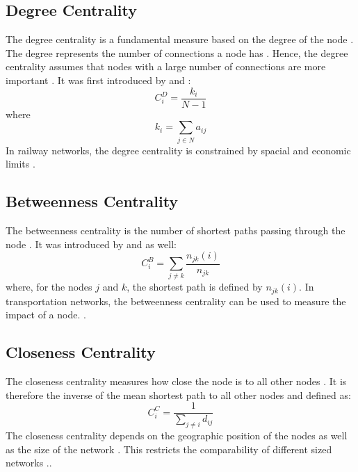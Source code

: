 \documentclass{Resources/netsci-project}
\begin{document}
\subsection{Degree Centrality}
The degree centrality is a fundamental measure based on the degree of the node \autocite{ComplexTopology}. The degree represents the number of connections a node has \autocite{ComplexTopology}. Hence, the degree centrality assumes that nodes with a large number of connections are more important \autocite{ComplexTopology}. It was first introduced by \textcite{Freeman} and \textcite{Freeman2}:
\begin{equation} \label{eqRestMass}
C_{i}^{D} = \dfrac{k_i}{N-1}
\end{equation}
where 
\begin{equation} \label{eqRestMass}
k_{i} = \sum_{j \in N}a_{ij}
\end{equation}
In railway networks, the degree centrality is constrained by spacial and economic limits \autocite{GraphSwiss}.

\subsection{Betweenness Centrality}
The betweenness centrality is the number of shortest paths passing through the node \autocite{ComplexTopology}. It was introduced  by \textcite{Freeman} and \textcite{Freeman2} as well:
\begin{equation} \label{eqRestMass}
C_{i}^{B} = \sum_{j \neq k} \dfrac{n_{jk}(i)}{n_{jk}}
\end{equation}
where, for the nodes $ j $ and $ k $, the shortest path is defined by $n_{jk}(i) $. In transportation networks, the betweenness centrality can be used to measure the impact of a node. \autocite{ComplexTopology}.

\subsection{Closeness Centrality}
The closeness centrality measures how close the node is to all other nodes \autocite{ComplexTopology}. It is therefore the inverse of the mean shortest path to all other nodes and defined as: \autocite{ComplexTopology}
\begin{equation} \label{eqRestMass}
C_{i}^{C} =\dfrac{1}{\sum_{j \neq i} d_{ij}}
\end{equation}
The closeness centrality depends on the geographic position of the nodes as well as the size of the network \autocite{GraphSwiss}. This restricts the comparability of different sized networks \autocite{GraphSwiss}..
\end{document}
